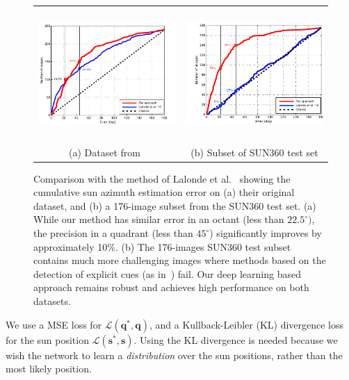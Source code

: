 \begin{figure}[!th]
    \centering
    \footnotesize
    \setlength{\tabcolsep}{1pt}
    \begin{tabular}{cc}
    \includegraphics[height=5cm]{figures/compare_jf12/lalonde-db-margin.pdf} & 
    \includegraphics[height=5cm]{figures/compare_jf12/sun360-db-margin.pdf} \\
    (a) Dataset from~\cite{lalonde-ijcv-12} &
    (b) Subset of SUN360 test set
    \end{tabular}
    \vspace{.5em} 
    \caption[Performance comparison on an urban dataset]{Comparison with the method of Lalonde et al.~\cite{lalonde-ijcv-12} showing the cumulative sun azimuth estimation error on (a) their original dataset, and (b) a 176-image subset from the SUN360 test set. (a) While our method has similar error in an octant (less than $22.5^\circ)$, the precision in a quadrant (less than $45^\circ$) significantly improves by approximately 10\%. (b) The 176-images SUN360 test subset contains much more challenging images where methods based on the detection of explicit cues (as in~\cite{lalonde-ijcv-12}) fail. Our deep learning based approach remains robust and achieves high performance on both datasets.}
    \label{fig:comparison-lalonde12}
\end{figure}

We use a MSE loss for $\mathcal{L}(\mathbf{q}^*, \mathbf{q})$, and a Kullback-Leibler (KL) divergence loss for the sun position $\mathcal{L}(\mathbf{s}^*, \mathbf{s})$. Using the KL divergence is needed because we wish the network to learn a \emph{distribution} over the sun positions, rather than the most likely position. 

